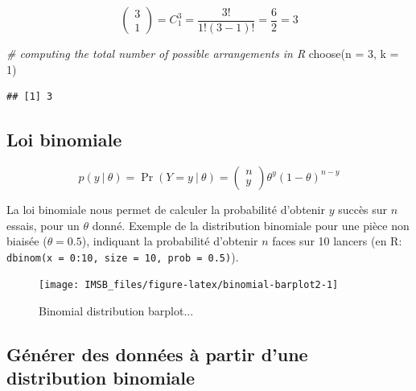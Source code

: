 \documentclass[
  a4paper,11pt,twoside,onecolumn,openright,final,oldfontcommands]{memoir}
\newenvironment{Shaded}{\begin{snugshade}}{\end{snugshade}}
\newcommand{\AttributeTok}[1]{\textcolor[rgb]{0.77,0.63,0.00}{#1}}
\newcommand{\CommentTok}[1]{\textcolor[rgb]{0.56,0.35,0.01}{\textit{#1}}}
\newcommand{\DecValTok}[1]{\textcolor[rgb]{0.00,0.00,0.81}{#1}}
\newcommand{\FunctionTok}[1]{\textcolor[rgb]{0.00,0.00,0.00}{#1}}
\newcommand{\NormalTok}[1]{#1}
\theoremstyle{definition}
\theoremstyle{definition}
\theoremstyle{definition}
\theoremstyle{definition}
\theoremstyle{remark}
\begin{document}
\[
\left(\begin{array}{l} 3 \\ 1\end{array}\right) = C_{1}^{3} = \frac{3 !}{1 !(3 - 1) !} = \frac{6}{2} = 3
\]

\begin{Shaded}
\begin{Highlighting}[]
\CommentTok{\# computing the total number of possible arrangements in R}
\FunctionTok{choose}\NormalTok{(}\AttributeTok{n =} \DecValTok{3}\NormalTok{, }\AttributeTok{k =} \DecValTok{1}\NormalTok{)}
\end{Highlighting}
\end{Shaded}

\begin{verbatim}
## [1] 3
\end{verbatim}

\hypertarget{loi-binomiale}{%
\subsection{Loi binomiale}\label{loi-binomiale}}

\[
p(y \ | \ \theta) = \Pr(Y = y \ | \ \theta) = \left(\begin{array}{l} n \\ y \end{array}\right) \theta^{y}(1 - \theta)^{n - y}
\]

La loi binomiale nous permet de calculer la probabilité d'obtenir \(y\) succès sur \(n\) essais, pour un \(\theta\) donné. Exemple de la distribution binomiale pour une pièce non biaisée (\(\theta = 0.5\)), indiquant la probabilité d'obtenir \(n\) faces sur 10 lancers (en R: \texttt{dbinom(x\ =\ 0:10,\ size\ =\ 10,\ prob\ =\ 0.5)}).

\begin{figure}[!htb]

{\centering \texttt{[image: IMSB\_files/figure-latex/binomial-barplot2-1]} 

}

\caption{Binomial distribution barplot...}\label{fig:binomial-barplot2}
\end{figure}

\hypertarget{guxe9nuxe9rer-des-donnuxe9es-uxe0-partir-dune-distribution-binomiale}{%
\subsection{Générer des données à partir d'une distribution binomiale}\label{guxe9nuxe9rer-des-donnuxe9es-uxe0-partir-dune-distribution-binomiale}}
\end{document}
